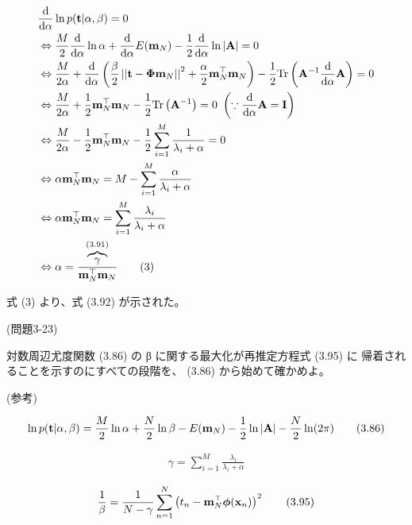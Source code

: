 \documentclass{jsarticle}
\begin{document}
\begin{align*}
    &\frac{{\rm d}}{{\rm d}\alpha}\ln p({\bf t}|\alpha,\beta)=0\\
    &\Leftrightarrow\frac{M}{2}\frac{{\rm d}}{{\rm d}\alpha}\ln\alpha+\frac{{\rm d}}{{\rm d}\alpha}E({\bf m}_N)-\frac{1}{2}\frac{{\rm d}}{{\rm d}\alpha}\ln|{\bf A}|=0\\
    &\Leftrightarrow\frac{M}{2\alpha}+\frac{{\rm d}}{{\rm d}\alpha}\left(\frac{\beta}{2} \left | \left | \mathbf t-\boldsymbol \Phi \mathbf m_N \right | \right | ^ 2+\frac{\alpha}{2}\mathbf m_N^\top \mathbf m_N\right)-\frac{1}{2}{\rm Tr}\left({\bf A}^{-1}\frac{\rm d}{{\rm d}\alpha}{\bf A}\right)=0\\
    &\Leftrightarrow\frac{M}{2\alpha}+\frac{1}{2}\mathbf m_N^\top \mathbf m_N-\frac{1}{2}{\rm Tr}\left({\bf A}^{-1}\right)=0\ \left(\because \frac{\rm d}{{\rm d}\alpha}{\bf A}={\bf I}\right)\\
    &\Leftrightarrow \frac{M}{2\alpha}-\frac{1}{2}{\bf m}_N^\top{\bf m}_N-\frac{1}{2}\sum_{i=1}^M\frac{1}{\lambda_i+\alpha}=0\\
    &\Leftrightarrow\alpha{\bf m}_N^\top{\bf m}_N=M-\sum_{i=1}^M\frac{\alpha}{\lambda_i+\alpha}\\
    &\Leftrightarrow\alpha{\bf m}_N^\top{\bf m}_N=\sum_{i=1}^M\frac{\lambda_i}{\lambda_i+\alpha}\\
    &\Leftrightarrow\alpha=\frac{\overbrace{\gamma}^{(3.91)}}{{\bf m}_N^\top{\bf m}_N}\tag{3}\\
    \end{align*}

式 (3) より、式 (3.92) が示された。

(問題3-23) 

対数周辺尤度関数 (3.86) の β に関する最大化が再推定方程式 (3.95) に
帰着されることを示すのにすべての段階を、 (3.86) から始めて確かめよ。

(参考)

\begin{align}
    \ln p({\bf t}|\alpha,\beta)=\frac{M}{2}\ln\alpha+\frac{N}{2}\ln\beta-E({\bf m}_N)-\frac{1}{2}\ln|{\bf A}|-\frac{N}{2}\ln(2\pi) \tag{3.86}
    \end{align}

\begin{align}
    \gamma=\sum_{i=1}^M\frac{\lambda_i}{\lambda_i+\alpha}\tag{3.91}
    \end{align}

\begin{align}
    \frac{1}{\beta}=\frac{1}{N-\gamma}\sum_{n=1}^N\left(t_n-{\bf m}_N^\top{\boldsymbol\phi}({\bf x}_n)\right)^2\tag{3.95}
    \end{align}
\end{document}
